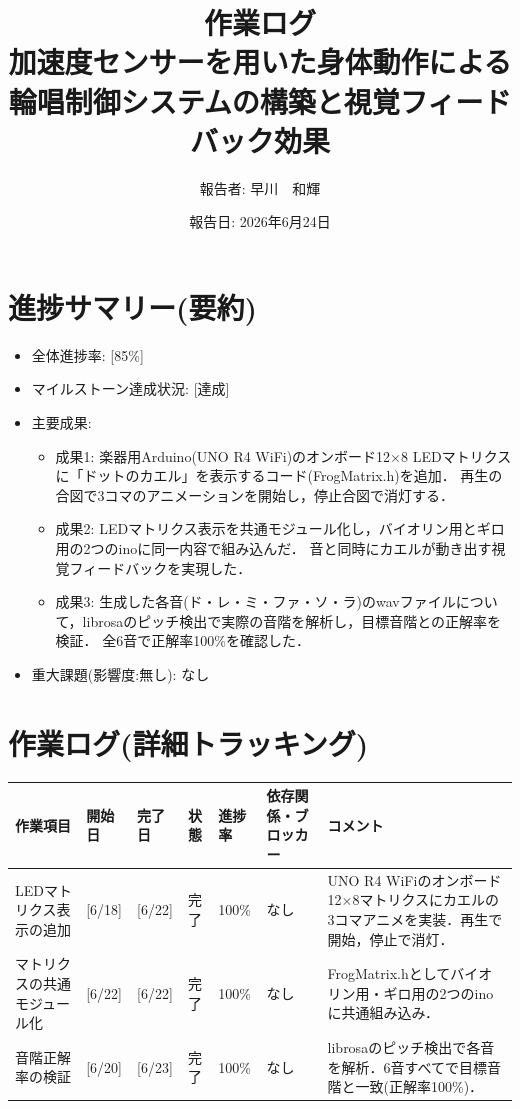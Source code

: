 \documentclass[uplatex,dvipdfmx]{jlreq}
\title{作業ログ\\ \large 加速度センサーを用いた身体動作による輪唱制御システムの構築と視覚フィードバック効果}
\author{報告者: 早川　和輝}
\date{報告日: 2026年6月24日}
\begin{document}
\maketitle

\section{進捗サマリー(要約)}
\begin{itemize}
    \item 全体進捗率: [85\%]
    \item マイルストーン達成状況: [達成]
    \item 主要成果:
    \begin{itemize}
        \item 成果1: 楽器用Arduino(UNO R4 WiFi)のオンボード12$\times$8 LEDマトリクスに「ドットのカエル」を表示するコード(FrogMatrix.h)を追加．
        再生の合図で3コマのアニメーションを開始し，停止合図で消灯する．
        \item 成果2: LEDマトリクス表示を共通モジュール化し，バイオリン用とギロ用の2つのinoに同一内容で組み込んだ．
        音と同時にカエルが動き出す視覚フィードバックを実現した．
        \item 成果3: 生成した各音(ド・レ・ミ・ファ・ソ・ラ)のwavファイルについて，librosaのピッチ検出で実際の音階を解析し，目標音階との正解率を検証．
        全6音で正解率100\%を確認した．
    \end{itemize}
    \item 重大課題(影響度:無し): なし
\end{itemize}

\section{作業ログ(詳細トラッキング)}
\begin{table}[H]
    \centering
    \small
    \begin{tabular}{lp{1.5cm}p{1.5cm}llp{2.5cm}p{3cm}}
        \toprule
        作業項目 & 開始日 & 完了日 & 状態 & 進捗率 & 依存関係・ブロッカー & コメント \\
        \midrule
        LEDマトリクス表示の追加 & [6/18] & [6/22] & 完了 & 100\% & なし & UNO R4 WiFiのオンボード12$\times$8マトリクスにカエルの3コマアニメを実装．再生で開始，停止で消灯． \\
        マトリクスの共通モジュール化 & [6/22] & [6/22] & 完了 & 100\% & なし & FrogMatrix.hとしてバイオリン用・ギロ用の2つのinoに共通組み込み． \\
        音階正解率の検証 & [6/20] & [6/23] & 完了 & 100\% & なし & librosaのピッチ検出で各音を解析．6音すべてで目標音階と一致(正解率100\%)． \\
        \bottomrule
    \end{tabular}
\end{table}
\end{document}
